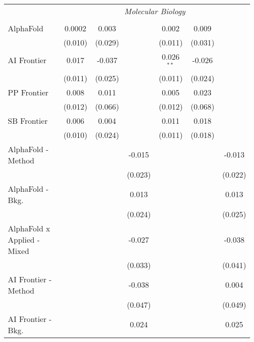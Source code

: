 \begin{tabular}{lcccccc}
 & \multicolumn{6}{c}{\textit{Molecular Biology}} \\ \\
   AlphaFold                     & 0.0002  & 0.003   &              & 0.002        & 0.009   &   \\   
                                 & (0.010) & (0.029) &              & (0.011)      & (0.031) &   \\   
   AI Frontier                   & 0.017   & -0.037  &              & 0.026$^{**}$ & -0.026  &   \\   
                                 & (0.011) & (0.025) &              & (0.011)      & (0.024) &   \\   
   PP Frontier                   & 0.008   & 0.011   &              & 0.005        & 0.023   &   \\   
                                 & (0.012) & (0.066) &              & (0.012)      & (0.068) &   \\   
   SB Frontier                   & 0.006   & 0.004   &              & 0.011        & 0.018   &   \\   
                                 & (0.010) & (0.024) &              & (0.011)      & (0.018) &   \\   
   AlphaFold - Method            &         &         & -0.015       &              &         & -0.013\\   
                                 &         &         & (0.023)      &              &         & (0.022)\\   
   AlphaFold - Bkg.              &         &         & 0.013        &              &         & 0.013\\   
                                 &         &         & (0.024)      &              &         & (0.025)\\   
   AlphaFold x Applied - Mixed   &         &         & -0.027       &              &         & -0.038\\   
                                 &         &         & (0.033)      &              &         & (0.041)\\   
   AI Frontier - Method          &         &         & -0.038       &              &         & 0.004\\   
                                 &         &         & (0.047)      &              &         & (0.049)\\   
   AI Frontier - Bkg.            &         &         & 0.024        &              &         & 0.025\\   

\end{tabular}
